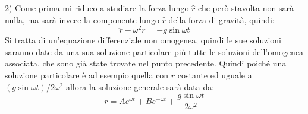 \documentclass[../main.tex]{subfiles}
\begin{document}
2) Come prima mi riduco a studiare la forza lungo $\hat{r}$ che però stavolta non sarà nulla, ma sarà invece la componente lungo $\hat r$ della forza di gravità, quindi:
\begin{equation}\label{avr:4}
  \ddot{r}-\omega^2r=-g \sin{\omega t}
 \end{equation}
Si tratta di un'equazione differenziale non omogenea, quindi le sue soluzioni saranno date da una sua soluzione particolare più tutte le soluzioni dell'omogenea associata,
che sono già state trovate nel punto precedente. Quindi poiché una soluzione particolare è ad esempio quella con $r$ costante ed uguale a 
$(g \sin{\omega t})/2\omega^2$ allora la soluzione generale sarà data da:
\begin{equation}\label{avr:5}
 r=Ae^{\omega t}+Be^{-\omega t}+\frac{g \sin{\omega t}}{2\omega^2}
\end{equation}
\end{document}

